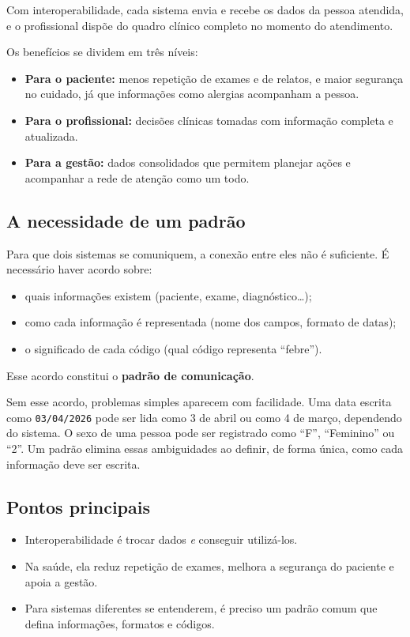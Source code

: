 \documentclass[11pt,a4paper]{article}
\newcommand{\codigo}[1]{\texttt{#1}}
\begin{document}
Com interoperabilidade, cada sistema envia e recebe os dados da pessoa
atendida, e o profissional dispõe do quadro clínico completo no momento do
atendimento.

Os benefícios se dividem em três níveis:

\begin{itemize}
  \item \textbf{Para o paciente:} menos repetição de exames e de
    relatos, e maior segurança no cuidado, já que informações como
    alergias acompanham a pessoa.
  \item \textbf{Para o profissional:} decisões clínicas tomadas com
    informação completa e atualizada.
  \item \textbf{Para a gestão:} dados consolidados que permitem
    planejar ações e acompanhar a rede de atenção como um todo.
\end{itemize}

\subsection{A necessidade de um padrão}

Para que dois sistemas se comuniquem, a conexão entre eles não é
suficiente. É necessário haver acordo sobre:

\begin{itemize}
  \item quais informações existem (paciente, exame, diagnóstico\ldots);
  \item como cada informação é representada (nome dos campos, formato de
    datas);
  \item o significado de cada código (qual código representa
    ``febre'').
\end{itemize}

Esse acordo constitui o \textbf{padrão de comunicação}.

Sem esse acordo, problemas simples aparecem com facilidade. Uma data
escrita como \codigo{03/04/2026} pode ser lida como 3 de abril ou como 4 de
março, dependendo do sistema. O sexo de uma pessoa pode ser registrado
como ``F'', ``Feminino'' ou ``2''. Um padrão elimina essas ambiguidades ao
definir, de forma única, como cada informação deve ser escrita.

\subsection*{Pontos principais}

\begin{itemize}
  \item Interoperabilidade é trocar dados \emph{e} conseguir utilizá-los.
  \item Na saúde, ela reduz repetição de exames, melhora a segurança do
    paciente e apoia a gestão.
  \item Para sistemas diferentes se entenderem, é preciso um padrão
    comum que defina informações, formatos e códigos.
\end{itemize}
\end{document}
